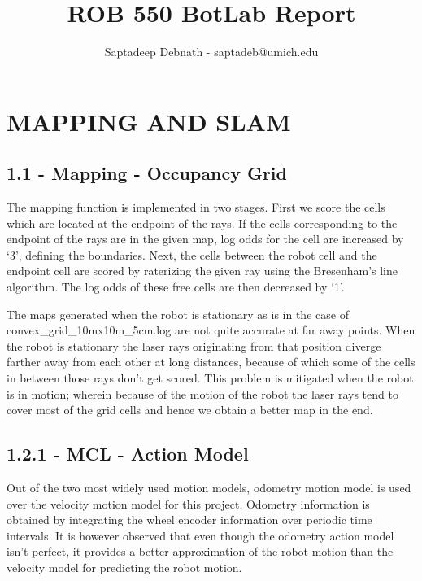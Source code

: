 \documentclass[journal,onecolumn]{IEEEtran}
\begin{document}
\title{%
  ROB 550 BotLab Report \\
  }
    
\author{Saptadeep Debnath - saptadeb@umich.edu}

\maketitle

\IEEEpeerreviewmaketitle

\section{MAPPING AND SLAM}

\subsection*{1.1 - Mapping - Occupancy Grid} 

The mapping function is implemented in two stages. First we score the cells which are located at the endpoint of the rays. If the cells corresponding to the endpoint of the rays are in the given map, log odds for the cell are increased by `3', defining the boundaries. Next, the cells between the robot cell and the endpoint cell are scored by raterizing the given ray using the Bresenham's line algorithm. The log odds of these free cells are then decreased by `1'. 

The maps generated when the robot is stationary as is in the case of convex\_grid\_10mx10m\_5cm.log are not quite accurate at far away points. When the robot is stationary the laser rays originating from that position diverge farther away from each other at long distances, because of which some of the cells in between those rays don't get scored. This problem is mitigated when the robot is in motion; wherein because of the motion of the robot the laser rays tend to cover most of the grid cells and hence we obtain a better map in the end.  

\subsection*{1.2.1 - MCL - Action Model} 

Out of the two most widely used motion models, odometry motion model is used over the velocity motion model for this project. Odometry information is obtained by integrating the wheel encoder information over periodic time intervals. It is however observed that even though the odometry action model isn't perfect, it provides a better approximation of the robot motion than the velocity model for predicting the robot motion.
\end{document}
